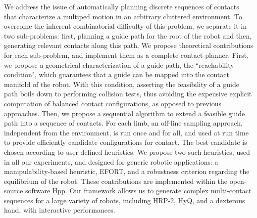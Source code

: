 We address the issue of automatically planning discrete sequences of contacts
that characterize a multiped motion in an arbitrary cluttered environment.
To overcome the inherent combinatorial difficulty of this problem, we separate it
in two sub-problems: first, planning a guide path for the root of the robot and
then, generating relevant contacts along this path.
We propose theoretical contributions for each sub-problem, and implement them
as a complete contact planner. 
First, we propose a geometrical characterization of a guide path, the ``reachability condition", which guarantees that a
guide can be mapped into the contact manifold of the robot. With this condition, asserting the feasibility
of a guide path boils down to performing collision tests, thus avoiding the expensive explicit computation of balanced contact configurations, as opposed to previous approaches.
Then, we propose a sequential algorithm to extend a feasible guide path into a sequence of contacts. For each limb, an off-line sampling approach,
independent from the environment, is run once and for all, and used at run time to provide efficiently candidate configurations for contact.
The best candidate is chosen according to user-defined heuristics. We propose two such heuristics, used in all our experiments, and 
designed for generic robotic applications: a manipulability-based heuristic, EFORT, and a robustness criterion regarding the equilibrium of the robot.
These contributions are implemented within the open-source software Hpp. Our framework allows us to generate complex multi-contact sequences for a large
variety of robots, including HRP-2, HyQ, and a dexterous hand, with interactive performances.
